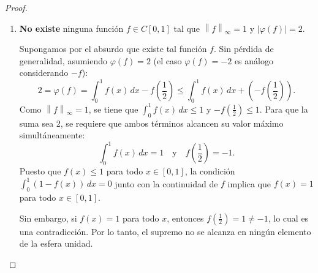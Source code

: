 \documentclass{article}
\theoremstyle{definition}
\newcommand{\norm}[1]{\left\lVert #1 \right\rVert}       %
\begin{document}
\begin{proof}
\begin{enumerate}
        \item \textbf{No existe} ninguna función \(f \in C[0,1]\) tal que \(\norm{f}_\infty = 1\) y \(|\varphi(f)| = 2\).

              Supongamos por el absurdo que existe tal función \(f\). Sin pérdida de generalidad, asumiendo \(\varphi(f) = 2\) (el caso \(\varphi(f) = -2\) es análogo considerando \(-f\)):
              \[
                  2 = \varphi(f) = \int_0^1 f(x) \, dx - f\left(\frac{1}{2}\right) \leq \int_0^1 f(x) \, dx + \left(-f\left(\frac{1}{2}\right)\right).
              \]
              Como \(\norm{f}_\infty = 1\), se tiene que \(\int_0^1 f(x) \, dx \leq 1\) y \(-f\left(\frac{1}{2}\right) \leq 1\). Para que la suma sea 2, se requiere que ambos términos alcancen su valor máximo simultáneamente:
              \[
                  \int_0^1 f(x) \, dx = 1 \quad \text{y} \quad f\left(\frac{1}{2}\right) = -1.
              \]
              Puesto que \(f(x) \leq 1\) para todo \(x \in [0,1]\), la condición \(\int_0^1 (1 - f(x)) \, dx = 0\) junto con la continuidad de \(f\) implica que \(f(x) = 1\) para todo \(x \in [0,1]\).

              Sin embargo, si \(f(x) = 1\) para todo \(x\), entonces \(f\left(\frac{1}{2}\right) = 1 \neq -1\), lo cual es una contradicción. Por lo tanto, el supremo no se alcanza en ningún elemento de la esfera unidad.
    \end{enumerate}
\end{proof}

\vspace{0.5cm}
\end{document}
